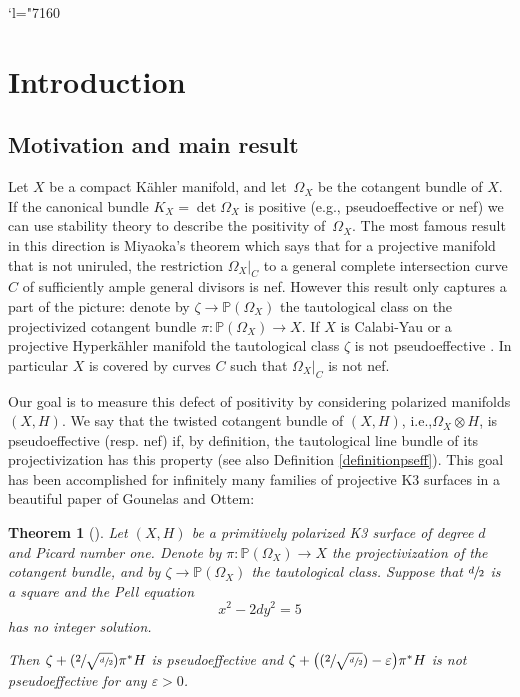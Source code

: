\documentclass[11pt]{article}
\newcommand{\ie}{i.e.,\xspace}
\newcommand{\eg}{e.g.,\xspace}
\newcommand{\resp}{resp.\xspace}
\newcommand{\Changel}{\mathcode`l="7160}
\newcommand{\Psfrac}[2]{(\sfrac{#1}{#2})}
\theoremstyle{plain}
\newtheorem{theorem}{Theorem}[section]
\theoremstyle{definition}
\newcommand{\PP}{\ensuremath{\mathbb{P}}}
\newcommand{\holom}[3]{\ensuremath{#1:#2\to #3}}
\begin{document}
\vspace*{-2\baselineskip}
\Changel

\section{Introduction}

\subsection{Motivation and main result}

Let $X$ be a compact Kähler manifold, and let~$\Omega_X$ be the cotangent bundle of $X$.
If the canonical bundle $K_X = \det \Omega_X$ is positive (\eg pseudoeffective or nef) we can use stability theory to describe the positivity of~$\Omega_X$. The most famous result in this direction is Miyaoka's theorem \cite{Miy87}
which says that for a projective manifold that is not uniruled, the restriction $\Omega_X|_C$ to a general complete intersection curve $C$ of sufficiently ample general divisors is nef. However this result only captures a part of the picture:
denote by $\zeta \to \PP(\Omega_X)$ the tautological class on the projectivized
cotangent bundle $\holom{\pi}{\PP(\Omega_X)}{X}$. If $X$ is Calabi-Yau or a projective Hyperkähler manifold
the tautological class $\zeta$ is not pseudoeffective \cite[Th.\,1.6]{HP19}. In particular $X$ is covered by curves $C$
such that $\Omega_X|_C$ is not nef.

Our goal is to measure this defect of positivity by considering polarized manifolds $(X, H)$. We say that the twisted cotangent bundle of $(X, H)$, \ie $\Omega_X\otimes H$, is pseudoeffective (\resp nef)
if, by definition, the tautological line bundle of its projectivization has this property (see also Definition \ref{definitionpseff}).
This goal has been accomplished for infinitely many families of projective K3 surfaces in a beautiful paper
of Gounelas and Ottem:

\begin{theorem}[{\cite[Th.\,B]{GO18}}]\label{gounelas}
Let $(X, H)$ be a primitively polarized K3 surface of degree $d$ and Picard number one.
Denote by $\holom{\pi}{\PP(\Omega_X)}{X}$ the projectivization of the cotangent bundle, and by $\zeta \to \PP(\Omega_X)$ the tautological class. Suppose that $\sfrac{d}{2}$ is a square and the Pell equation
\[
x^2-2 dy^2=5
\]
has no integer solution.

Then $\zeta+\Psfrac{2}{\sqrt{\sfrac{d}{2}}}\pi^*H$ is pseudoeffective and
\hbox{$\zeta+\bigl(\Psfrac{2}{\sqrt{\sfrac{d}{2}}}-\varepsilon\bigr)\pi^*H$} is not pseudoeffective for any $\varepsilon>0$.
\end{theorem}
\end{document}
